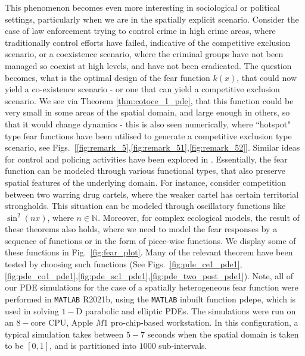 \documentclass[10pt]{amsart}
\theoremstyle{definition}
\begin{document}
This phenomenon becomes even more interesting in sociological or political settings, particularly when we are in the spatially explicit scenario. Consider the case of law enforcement trying to control crime in high crime areas, where traditionally control efforts have failed, indicative of the competitive exclusion scenario, or a coexistence scenario, where the criminal groups have not been managed so coexist at high levels, and have not been eradicated. The question becomes, what is the optimal design of the fear function $k(x)$, that could now yield a co-existence scenario - or one that can yield a competitive exclusion scenario. We see via Theorem \ref{thm:cotoce_1_pde}, that this function could be very small in some areas of the spatial domain, and large enough in others, so that it would change dynamics - this is also seen numerically, where ``hotspot" type fear functions have been utilised to generate a competitive exclusion type scenario, see Figs.~[\ref{fig:remark_5},\ref{fig:remark_51},\ref{fig:remark_52}]. Similar ideas for control and policing activities have been explored in \cite{Rod21, Ber13}. Essentially, the fear function can be modeled  through various functional types, that also preserve spatial features of the underlying domain. For instance, consider competition between two warring drug cartels, where the weaker cartel has certain territorial strongholds. This situation can be modeled through oscillatory functions like $\sin^2(nx)$, where $n\in \mathbb{N}$. Moreover, for complex ecological models, the result of these theorems also holds, where we need to model the fear responses by a sequence of functions or in the form of piece-wise functions. We display some of these functions in Fig.~\ref{fig:fear_plot}. Many of the relevant theorem have been tested by choosing such functions (See Figs.~\ref{fig:pde_ce1_pde1},\ref{fig:pde_co1_pde1},\ref{fig:pde_sc1_pde1},\ref{fig:pde_two_post_pde1}). Note, all of our PDE simulations for the case of a spatially heterogeneous fear function were performed in \verb|MATLAB| R2021b, using the \verb|MATLAB| inbuilt function pdepe, which is used in solving $1-$D parabolic and elliptic PDEs. The simulations were run on an $8-$core CPU, Apple $M1$ pro-chip-based workstation. In this configuration, a typical simulation takes between $5-7$ seconds when the spatial domain is taken to be $[0,1]$, and is partitioned into $1000$ sub-intervals.
\end{document}
